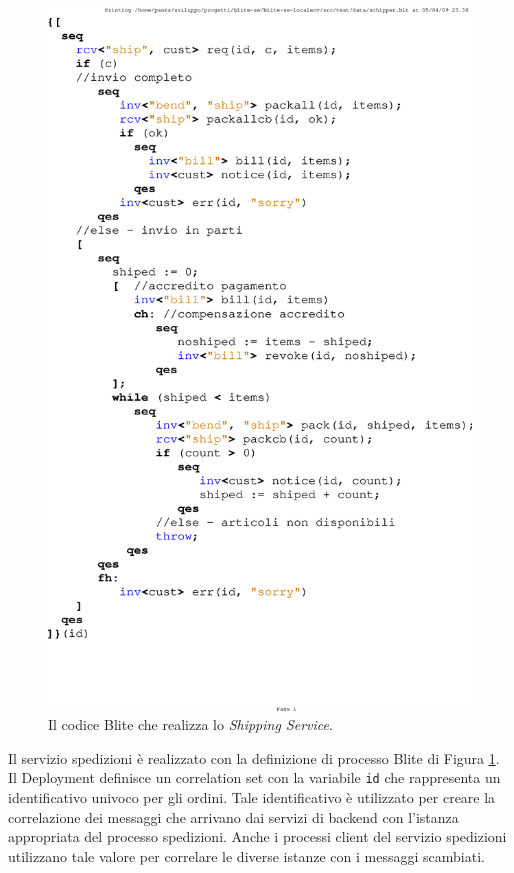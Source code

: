 \begin{figure}[tp]
\begin{center}
  \includegraphics[scale=0.80,clip]{blide/dia/shipper}
   \caption[Codice Blite, il Servizio Spedizioni]{Il codice Blite che realizza
   lo
   \emph{Shipping Service}.}
  \label{fig:shipper}
\end{center}
\end{figure}

Il servizio spedizioni è realizzato con la definizione di processo Blite di
Figura \ref{fig:shipper}. Il Deployment definisce un correlation set con la
variabile \texttt{id} che rappresenta un identificativo univoco per gli ordini.
Tale identificativo è utilizzato per creare la correlazione dei messaggi che
arrivano dai servizi di backend con l'istanza appropriata del processo
spedizioni. Anche i processi client del servizio spedizioni utilizzano tale
valore per correlare le diverse istanze con i messaggi scambiati.

